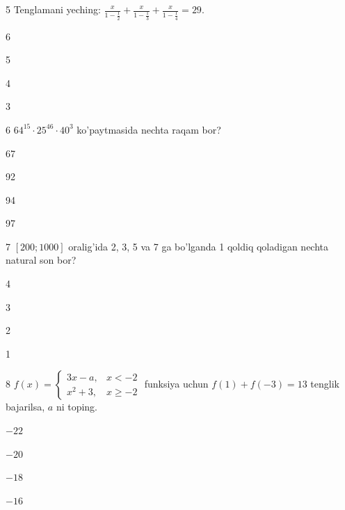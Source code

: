 \documentclass[14pt]{article}
\begin{document}
\begin{questionbox}{5}
    Tenglamani yeching: \(\frac{x}{1-\frac{1}{2}} + \frac{x}{1-\frac{1}{3}} + \frac{x}{1-\frac{1}{4}} = 29\).
    \begin{options}
        \item 6
        \item 5
        \item 4
        \item 3
    \end{options}
\end{questionbox}

\begin{questionbox}{6}
    \(64^{15} \cdot 25^{46} \cdot 40^{3}\) ko'paytmasida nechta raqam bor?
    \begin{options}
        \item 67
        \item 92
        \item 94
        \item 97
    \end{options}
\end{questionbox}

\begin{questionbox}{7}
    \([200; 1000]\) oralig'ida 2, 3, 5 va 7 ga bo'lganda 1 qoldiq qoladigan nechta natural son bor?
    \begin{options}
        \item 4
        \item 3
        \item 2
        \item 1
    \end{options}
\end{questionbox}

\begin{questionbox}{8}
    \(f(x) = \begin{cases} 3x - a, & x < -2 \\ x^2 + 3, & x \geq -2 \end{cases}\) funksiya uchun \(f(1) + f(-3) = 13\) tenglik bajarilsa, \(a\) ni toping.
    \begin{options}
        \item \(-22\)
        \item \(-20\)
        \item \(-18\)
        \item \(-16\)
    \end{options}
\end{questionbox}
\end{document}
